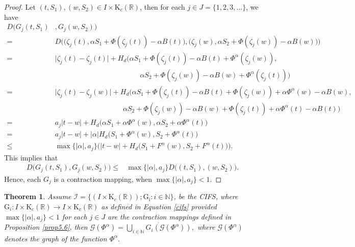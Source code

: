\documentclass[12pt,oneside,reqno]{amsart}
\newtheorem{theorem}{Theorem}[section]
\theoremstyle{definition}
\theoremstyle{remark}
\begin{document}
 \begin{proof}
 Let $(t,S_1),(w,S_2)\in I \times \mathrm{K}_c(\mathbb{R})$, then for each $j\in J=\{1,2,3,\ldots\}$, we have
\begin{align*}
      D\big(G_j(t,S_1)&,G_j(w,S_2)\big)\\
     =&D\Big(\big(\zeta_j(t),\alpha S_1+\Phi(\zeta_j(t))-\alpha B(t)\big),\big(\zeta_j(w),\alpha S_2+\Phi(\zeta_j(w))-\alpha B(w)\big)\Big)\\
     =&\big\lvert \zeta_j(t)-\zeta_j(t)\big\rvert + H_d\Big(\alpha S_1+\Phi(\zeta_j(t))-\alpha B(t)+\Phi^{\alpha}(\zeta_j(w)),\\
     &\hspace{5cm}\alpha S_2+\Phi(\zeta_j(w))-\alpha B(w)+\Phi^{\alpha}(\zeta_j(t))\Big)\\
     =&\big\lvert \zeta_j(t)-\zeta_j(w)\big\rvert+ H_d\Big(\alpha S_1+\Phi(\zeta_j(t))-\alpha B(t)+\Phi(\zeta_j(w))+\alpha \Phi^{\alpha}(w)-\alpha B(w),\\
     &\hspace{4cm}\alpha S_2+\Phi(\zeta_j(w))-\alpha B(w)+\Phi(\zeta_j(t))+\alpha \Phi^{\alpha}(t)-\alpha B(t) \Big)\\
     =&a_j \big\lvert t-w \big\rvert+H_d\Big(\alpha S_1+\alpha \Phi^{\alpha}(w),\alpha S_2+\alpha \Phi^{\alpha}(t) \Big)\\
     =&a_j \big\lvert t-w \big\rvert+\lvert \alpha \rvert H_d\Big( S_1+ \Phi^{\alpha}(w), S_2+ \Phi^{\alpha}(t) \Big)\\
     \le& \max\{\lvert \alpha \rvert,a_j\} \Big(\big\lvert t-w \big\rvert+H_d\Big( S_1+ F^{\alpha}(w), S_2+ F^{\alpha}(t) \Big) \Big).
 \end{align*}
 This implies that
 \begin{align*}
  D\big(G_j(t,S_1),G_j(w,S_2)\big) 
     \le&\max\{\lvert \alpha \rvert,a_j\} D\big((t,S_1),(w,S_2)\big).
  \end{align*}
 Hence, each $G_j$ is a contraction mapping, when  $\max\{\lvert \alpha \rvert,a_j\}< 1$. 
 \end{proof}
 \begin{theorem} \label{theorem4.8}
     Assume $\mathcal{I}=\{(I\times \mathrm{K}_c(\mathbb{R})); \mathrm{G_i}: i\in \mathbb{N}\}$, be the CIFS, where $\mathrm{G}_i: I \times\mathrm{K}_c(\mathbb{R}) \rightarrow I\times \mathrm{K}_c(\mathbb{R})$ as defined in Equation \ref{cifs} provided $\max\{\lvert \alpha \rvert,a_j\}<1$ for each $j\in J$  are the contraction mappings defined in Proposition \ref{prop5.6}, then $\mathcal{G}(\Phi^\alpha)=\overline{ \underset{i\in \mathbb{N}}{\bigcup}G_i(\mathcal{G}(\Phi^\alpha))},$ where $\mathcal{G}(\Phi^\alpha)$ denotes the graph of the function $\Phi^\alpha .$
 \end{theorem}
\end{document}
